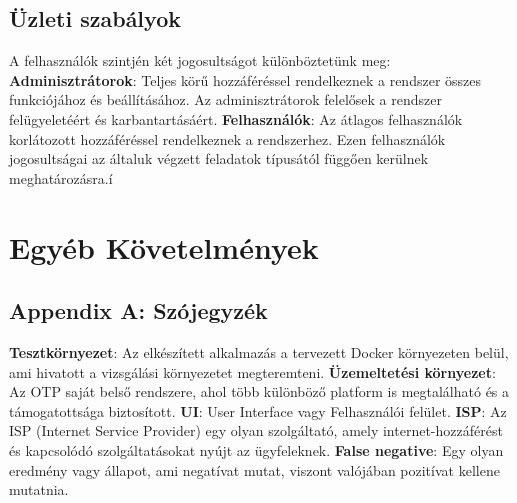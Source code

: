 \documentclass{scrreprt}
\begin{document}
\section{Üzleti szabályok}
A felhasználók szintjén két jogosultságot különböztetünk meg: \newline\newline \textbf{Adminisztrátorok}: Teljes körű hozzáféréssel rendelkeznek a rendszer
összes funkciójához és beállításához. Az adminisztrátorok felelősek a rendszer felügyeletéért és karbantartásáért. \newline\newline \textbf{Felhasználók}: Az
átlagos felhasználók korlátozott hozzáféréssel rendelkeznek a rendszerhez. Ezen felhasználók jogosultságai az általuk végzett feladatok típusától függően
kerülnek meghatározásra.í

\chapter{Egyéb Követelmények}

\section{Appendix A: Szójegyzék}

\textbf{Tesztkörnyezet}: Az elkészített alkalmazás a tervezett Docker környezeten belül, ami hivatott a vizsgálási környezetet megteremteni.
\newline\newline
\textbf{Üzemeltetési környezet}: Az OTP saját belső rendszere, ahol több különböző platform is megtalálható és a támogatottsága biztosított.
\newline\newline
\textbf{UI}: User Interface vagy Felhasználói felület.
\newline\newline
\textbf{ISP}: Az ISP (Internet Service Provider) egy olyan szolgáltató, amely internet-hozzáférést és kapcsolódó szolgáltatásokat nyújt az ügyfeleknek.
\newline\newline
\textbf{False negative}: Egy olyan eredmény vagy állapot, ami negatívat mutat, viszont valójában pozitívat kellene mutatnia.
\newline\newline
\end{document}
